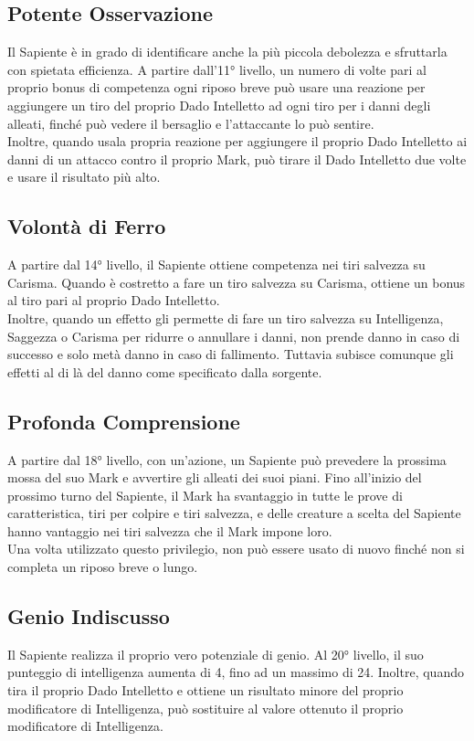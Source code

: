 \subsection{Potente Osservazione}
Il Sapiente è in grado di identificare anche la più piccola debolezza e sfruttarla con spietata efficienza. A partire dall'11° livello, un numero di volte pari al proprio bonus di competenza ogni riposo breve può usare una reazione per aggiungere un tiro del proprio Dado Intelletto ad ogni tiro per i danni degli alleati, finché può vedere il bersaglio e l'attaccante lo può sentire.\\
Inoltre, quando usala propria reazione per aggiungere il proprio Dado Intelletto ai danni di un attacco contro il proprio Mark, può tirare il Dado Intelletto due volte e usare il risultato più alto.

\subsection{Volontà di Ferro}
A partire dal 14° livello, il Sapiente ottiene competenza nei tiri salvezza su Carisma. Quando è costretto a fare un tiro salvezza su Carisma, ottiene un bonus al tiro pari al proprio Dado Intelletto.\\
Inoltre, quando un effetto gli permette di fare un tiro salvezza su Intelligenza, Saggezza o Carisma per ridurre o annullare i danni, non prende danno in caso di successo e solo metà danno in caso di fallimento. Tuttavia subisce comunque gli effetti al di là del danno come specificato dalla sorgente.

\subsection{Profonda Comprensione}
A partire dal 18° livello, con un'azione, un Sapiente può prevedere la prossima mossa del suo Mark e avvertire gli alleati dei suoi piani. Fino all'inizio del prossimo turno del Sapiente, il Mark ha svantaggio in tutte le prove di caratteristica, tiri per colpire e tiri salvezza, e delle creature a scelta del Sapiente hanno vantaggio nei tiri salvezza che il Mark impone loro.\\
Una volta utilizzato questo privilegio, non può essere usato di nuovo finché non si completa un riposo breve o lungo.

\subsection{Genio Indiscusso}
Il Sapiente realizza il proprio vero potenziale di genio. Al 20° livello, il suo punteggio di intelligenza aumenta di 4, fino ad un massimo di 24. Inoltre, quando tira il proprio Dado Intelletto e ottiene un risultato minore del proprio modificatore di Intelligenza, può sostituire al valore ottenuto il proprio modificatore di Intelligenza.

